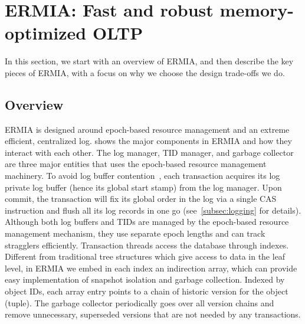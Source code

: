 
\section{ERMIA: Fast and robust memory-optimized OLTP}
In this section, we start with an overview of ERMIA, and then describe the key pieces of ERMIA, with a focus on why we choose the design trade-offs we do.

\subsection{Overview}
ERMIA is designed around epoch-based resource management and an extreme efficient, centralized log.  shows the major components in ERMIA and how they interact with each other. The log manager, TID manager, and garbage collector are three major entities that uses the epoch-based resource management machinery. To avoid log buffer contention~\cite{WangJ14}, each transaction acquires its log private log buffer (hence its global start stamp) from the log manager. Upon commit, the transaction will fix its global order in the log via a single CAS instruction and flush all its log records in one go (see~\ref{subsec:logging} for details). Although both log buffers and TIDs are managed by the epoch-based resource management mechanism, they use separate epoch lengths and can track stragglers efficiently. Transaction threads access the database through indexes. Different from traditional tree structures which give access to data in the leaf level, in ERMIA we embed in each index an indirection array, which can provide easy implementation of snapshot isolation and garbage collection. Indexed by object IDs, each array entry points to a chain of historic version for the object (tuple). The garbage collector periodically goes over all version chains and remove unnecessary, superseded versions that are not needed by any transactions.

